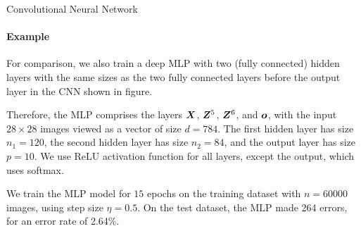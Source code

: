 \begin{frame}{Convolutional Neural Network}
\framesubtitle{Example}
    
    For comparison, we also train a deep MLP with two (fully
    connected) hidden layers with the same sizes as the two fully
    connected layers before the output layer in the CNN shown in
    figure. 

\medskip

Therefore, the MLP comprises the layers
    ${\boldsymbol X}$, ${\boldsymbol Z}^5$, ${\boldsymbol Z}^6$, and ${\boldsymbol o}$, with the input $28\times28$
    images viewed as a vector of size $d=784$. The first hidden layer
    has size $n_1 = 120$, the second hidden layer has size $n_2=84$, and
    the output layer has size $p=10$. We use ReLU activation function
    for all layers, except the output, which uses softmax. 

	\medskip

	We train the
    MLP model for $15$ epochs on the training dataset with $n=60000$
    images, using step size $\eta=0.5$. On the test dataset, the MLP
    made 264 errors, for an error rate of 2.64\%.


\end{frame}
%
